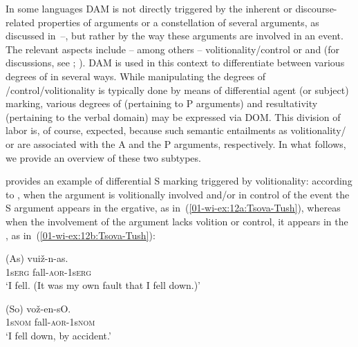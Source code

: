 \documentclass[output=paper]{LSP/langsci}
\begin{document}
In some languages DAM is not directly triggered by the inherent or discourse-related properties of arguments or a constellation of several arguments, as discussed in~–, but rather by the way these arguments are involved in an event. 
The relevant aspects include – among others – volitionality/control or  and  (for discussions, see \citealt{Naess2004What, McGregor2006Focal}; \citealt[4]{Fauconnier2012Constructional}). 
DAM is used in this context to differentiate between various degrees of  in several ways. 
While manipulating the degrees of /control/volitionality is typically done by means of differential agent (or subject) marking, various degrees of  (pertaining to P arguments) and resultativity (pertaining to the verbal domain) may be expressed via DOM. 
This division of labor is, of course, expected, because such semantic entailments as volitionality/ %
or  %
are associated with the A and the P arguments, respectively. 
In what follows, we provide an overview of these two subtypes.


 provides an example of differential S marking triggered by volitionality: according to \citet{Holisky1987Case}, when the argument is volitionally involved and/or in control of the event the S argument appears in the ergative, as in~(\ref{01-wi-ex:12a:Tsova-Tush}), whereas when the involvement of the argument lacks volition or control, it appears in the , as in~(\ref{01-wi-ex:12b:Tsova-Tush}):

\ea\label{01-wi-ex:12:Tsova-Tush}
\begin{xlist}

\ex\label{01-wi-ex:12a:Tsova-Tush}
	\gll (As) 		vuiž-n-as.\\
	1s\textsc{erg}	fall-\textsc{aor}-1s\textsc{erg}\\
	\glt ‘I fell. (It was my own fault that I fell down.)’

\ex\label{01-wi-ex:12b:Tsova-Tush}
	\gll (So)		vož-en-sO.\\
	1s\textsc{nom}	fall-\textsc{aor}-1s\textsc{nom}\\
	\glt ‘I fell down, by accident.’
\end{xlist}
\z
\end{document}
